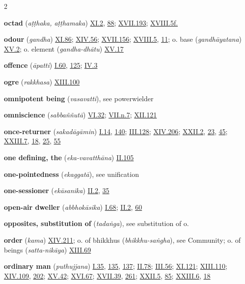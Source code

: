 \begin{multicols}{2}
\begin{vismHanging}
\par\textbf{octad} (\emph{aṭṭhaka, aṭṭhamaka}) \hyperlink{XI.2}{XI.2}{}, \hyperlink{XI.88}{88}{}; \hyperlink{XVII.193}{XVII.193}{}; \hyperlink{XVIII.5}{XVIII.5f.}{}
\par\textbf{odour} (\emph{gandha}) \hyperlink{XI.86}{XI.86}{}; \hyperlink{XIV.56}{XIV.56}{}; \hyperlink{XVII.156}{XVII.156}{}; \hyperlink{XVIII.5}{XVIII.5}{}, \hyperlink{XVIII.11}{11}{}; o. base (\emph{gandhāyatana}) \hyperlink{XV.2}{XV.2}{}; o. element (\emph{gandha-dhātu}) \hyperlink{XV.17}{XV.17}{}
\par\textbf{offence} (\emph{āpatti}) \hyperlink{I.60}{I.60}{}, \hyperlink{I.125}{125}{}; \hyperlink{IV.3}{IV.3}{}
\par\textbf{ogre} (\emph{rakkhasa}) \hyperlink{XIII.100}{XIII.100}{}
\par\textbf{omnipotent being} (\emph{vasavatti}), see powerwielder 
\par\textbf{omniscience} (\emph{sabbaññutā}) \hyperlink{VI.32}{VI.32}{}; \hyperlink{VII.n7}{VII.n.7}{}; \hyperlink{XII.121}{XII.121}{}
\par\textbf{once-returner} (\emph{sakadāgāmin}) \hyperlink{I.14}{I.14}{}, \hyperlink{I.140}{140}{}; \hyperlink{III.128}{III.128}{}; \hyperlink{XIV.206}{XIV.206}{}; \hyperlink{XXII.2}{XXII.2}{}, \hyperlink{XXII.23}{23}{}, \hyperlink{XXII.45}{45}{}; \hyperlink{XXIII.7}{XXIII.7}{}, \hyperlink{XXIII.18}{18}{}, \hyperlink{XXIII.25}{25}{}, \hyperlink{XXIII.55}{55}{}
\par\textbf{one defining, the} (\emph{eka-vavatthāna}) \hyperlink{II.105}{II.105}{}
\par\textbf{one-pointedness} (\emph{ekaggatā}), see unification
\par\textbf{one-sessioner} (\emph{ekāsanika}) \hyperlink{II.2}{II.2}{}, \hyperlink{II.35}{35}{}
\par\textbf{open-air dweller} (\emph{abbhokāsika}) \hyperlink{I.68}{I.68}{}; \hyperlink{II.2}{II.2}{}, \hyperlink{II.60}{60}{}
\par\textbf{opposites, substitution of} (\emph{tadaṅga}), see substitution of o. 
\par\textbf{order} (\emph{kama}) \hyperlink{XIV.211}{XIV.211}{}; o. of bhikkhus (\emph{bhikkhu-saṅgha}), see Community; o. of beings (\emph{satta-nikāya}) \hyperlink{XIII.69}{XIII.69}{}
\par\textbf{ordinary man} (\emph{puthujjana}) \hyperlink{I.35}{I.35}{}, \hyperlink{I.135}{135}{}, \hyperlink{I.137}{137}{}; \hyperlink{II.78}{II.78}{}; \hyperlink{III.56}{III.56}{}; \hyperlink{XI.121}{XI.121}{}; \hyperlink{XIII.110}{XIII.110}{}; \hyperlink{XIV.109}{XIV.109}{}, \hyperlink{XIV.202}{202}{}; \hyperlink{XV.42}{XV.42}{}; \hyperlink{XVI.67}{XVI.67}{}; \hyperlink{XVII.39}{XVII.39}{}, \hyperlink{XVII.261}{261}{}; \hyperlink{XXII.5}{XXII.5}{}, \hyperlink{XXII.85}{85}{}; \hyperlink{XXIII.6}{XXIII.6}{}, \hyperlink{XXIII.18}{18}{}

\end{vismHanging}
\end{multicols}
